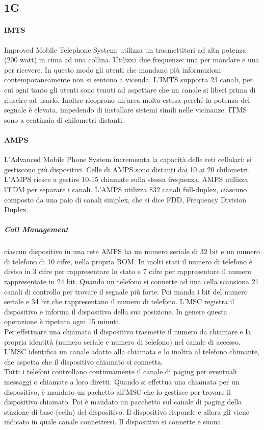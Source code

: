 \documentclass{article}
\begin{document}
\subsection{1G}

\paragraph{IMTS} Improved Mobile Telephone System: utilizza un trasmettitori ad
alta potenza (200 watt) in cima ad una collina. Utilizza due frequenze: una per
mandare e una per ricevere. In questo modo gli utenti che mandano più
informazioni contemporaneamente non si sentono a vicenda. L'IMTS supporta 23
canali, per cui ogni tanto gli utenti sono tenuti ad aspettare che un canale si
liberi prima di riuscire ad usarlo. Inoltre ricoprono un'area molto estesa
perché la potenza del segnale è elevata, impedendo di installare sistemi
simili nelle vicinanze. ITMS sono a centinaia di chilometri distanti.

\paragraph{AMPS} L'Advanced Mobile Phone System incrememta la capacità delle
reti cellulari: si gestiscono più dispositivi. Celle di AMPS sono distanti dai
10 ai 20 chilometri. L'AMPS riesce a gestire 10-15 chiamate sulla stessa
frequenza. AMPS utilizza l'FDM per separare i canali. L'AMPS utilizza 832
canali full-duplex, ciascuno composto da una paio di canali simplex, che si dice
FDD, Frequency Division Duplex.
\subparagraph{Call Management} ciascun dispositivo in una rete AMPS ha un numero
seriale di 32 bit e un numero di telefono di 10 cifre, nella propria ROM.
In molti stati il numero di telefono è diviso in 3 cifre per rappresentare lo
stato e 7 cifre per rappresentare il numero rappresentate in 24 bit. Quando un
telefono si connette ad una cella scansiona 21 canali di controllo per trovare
il segnale più forte. Poi manda i bit del numero seriale e 34 bit che
rappresentano il numero di telefono. L'MSC registra il dispositivo e informa il
dispositivo della sua posizione. In genere questa operazione è ripetuta ogni 15
minuti.\\
Per effettuare una chiamata il dispositivo trasmette il numero da chiamare e la
propria identità (numero seriale e numero di telefono) nel canale di accesso.
L'MSC identifica un canale adatto alla chiamata e lo inoltra al telefono
chimante, che aspetta che il dispositivo chiamato si connetta.\\
Tutti i telefoni controllano continuamente il canale di paging per eventuali
messaggi o chiamate a loro diretti. Quando si effettua una chiamata per un
dispositivo, è mandato un pachetto all'MSC che lo gestisce per trovare il
dispositivo chiamato. Poi è mandato un pacchetto sul canale di paging della
stazione di base (cella) del dispositivo. Il dispositivo risponde e allora gli
viene indicato in quale canale connettersi. Il dispositivo si connette e suona.
\end{document}
